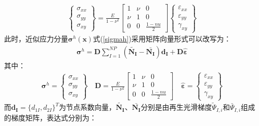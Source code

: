 \begin{equation}
\begin{split}
    \left\{\begin{matrix}
    \sigma_{xx}\\\sigma_{yy}\\\sigma_{xy}
    \end{matrix}\right\}=\frac{E}{1-\nu^2}
    \left[\begin{matrix}
    1&\nu&0\\\nu&1&0\\0&0&\frac{1-nu}{2}
    \end{matrix}\right]
    \left\{\begin{matrix}
    \varepsilon_{xx}\\\varepsilon_{yy}\\\gamma_{xy}
 \end{matrix}\right\}
\end{split}
\end{equation}
此时，近似应力分量$\pmb{\sigma}^h(\pmb{x})$式(\ref{sigmah})采用矩阵向量形式可以改写为：
\begin{equation}
\begin{split}
\pmb{\sigma}^h=\pmb{D}\sum_{I=1}^{N\!P}(\tilde{\pmb{N_I}}-\bar{\pmb{N_I}})\pmb{d_I}+\pmb{D}\hat{\pmb{\varepsilon}}
\end{split}
\end{equation}
其中：
\begin{equation}
\begin{split}
    \pmb{\sigma}^h=\left\{\begin{matrix}
        \sigma_{xx}\\\sigma_{yy}\\\sigma_{xy}
        \end{matrix}\right\}\quad
    \pmb{D}=\frac{E}{1-\nu^2}
    \left[\begin{matrix}
    1&\nu&0\\\nu&1&0\\0&0&\frac{1-nu}{2}
    \end{matrix}\right]\quad
    \hat{\pmb{\varepsilon}}=\left\{\begin{matrix}
        \varepsilon_{xx}\\\varepsilon_{yy}\\\gamma_{xy}
     \end{matrix}\right\}
\end{split}
\end{equation}
而$\pmb{d_I}=\{d_{1I},d_{2I}\}^T$为节点系数向量，$\tilde{\pmb{N_I}}\text{、}\bar{\pmb{N_I}}$分别是由再生光滑梯度$\tilde{\Psi}_{I,i}$和$\bar{\Psi}_{I,i}$组成的梯度矩阵，表达式分别为：

